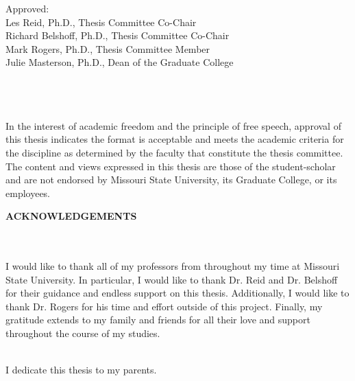 \documentclass[12pt]{report}
\theoremstyle{newthm}
\begin{document}
\noindent Approved:\\
\noindent Les Reid, Ph.D., Thesis Committee Co-Chair\\
\noindent Richard Belshoff, Ph.D., Thesis Committee Co-Chair\\
\noindent Mark Rogers, Ph.D., Thesis Committee Member\\
\noindent Julie Masterson, Ph.D., Dean of the Graduate College
\\~\\~\\~\\
\begin{spacing}{1}
\noindent In the interest of academic freedom and the principle of free speech, approval of this thesis indicates the format is acceptable and meets the academic criteria for the discipline as determined by the faculty that constitute the thesis committee. The content and views expressed in this thesis are those of the student-scholar and are not endorsed by Missouri State University, its Graduate College, or its employees.

\end{spacing}
\newpage
%
\centerline{\textbf{ACKNOWLEDGEMENTS}}\\~\\
I would like to thank all of my professors from throughout my time at Missouri State University. In particular, I would like to thank Dr. Reid and Dr. Belshoff for their guidance and endless support on this thesis. Additionally, I would like to thank Dr. Rogers for his time and effort outside of this project. Finally, my gratitude extends to my family and friends for all their love and support throughout the course of my studies.
\\~\\
\begin{center}
I dedicate this thesis to my parents.
\end{center}

\newpage

\tableofcontents
\newpage

\doublespacing
\end{document}
